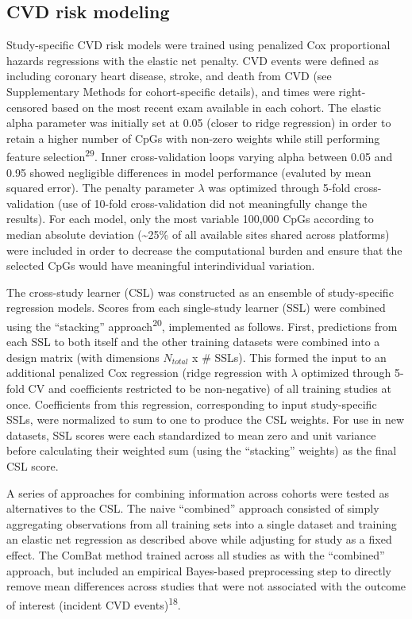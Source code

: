 \documentclass[]{article}
\begin{document}
\hypertarget{cvd-risk-modeling}{%
\subsection{CVD risk modeling}\label{cvd-risk-modeling}}

Study-specific CVD risk models were trained using penalized Cox
proportional hazards regressions with the elastic net penalty. CVD
events were defined as including coronary heart disease, stroke, and
death from CVD (see Supplementary Methods for cohort-specific details),
and times were right-censored based on the most recent exam available in
each cohort. The elastic alpha parameter was initially set at 0.05
(closer to ridge regression) in order to retain a higher number of CpGs
with non-zero weights while still performing feature
selection\textsuperscript{29}. Inner cross-validation loops varying
alpha between 0.05 and 0.95 showed negligible differences in model
performance (evaluted by mean squared error). The penalty parameter
\(\lambda\) was optimized through 5-fold cross-validation (use of
10-fold cross-validation did not meaningfully change the results). For
each model, only the most variable 100,000 CpGs according to median
absolute deviation (\textasciitilde{}25\% of all available sites shared
across platforms) were included in order to decrease the computational
burden and ensure that the selected CpGs would have meaningful
interindividual variation.

The cross-study learner (CSL) was constructed as an ensemble of
study-specific regression models. Scores from each single-study learner
(SSL) were combined using the ``stacking'' approach\textsuperscript{20},
implemented as follows. First, predictions from each SSL to both itself
and the other training datasets were combined into a design matrix (with
dimensions \(N_{total}\) x \# SSLs). This formed the input to an
additional penalized Cox regression (ridge regression with \(\lambda\)
optimized through 5-fold CV and coefficients restricted to be
non-negative) of all training studies at once. Coefficients from this
regression, corresponding to input study-specific SSLs, were normalized
to sum to one to produce the CSL weights. For use in new datasets, SSL
scores were each standardized to mean zero and unit variance before
calculating their weighted sum (using the ``stacking'' weights) as the
final CSL score.

A series of approaches for combining information across cohorts were
tested as alternatives to the CSL. The naive ``combined'' approach
consisted of simply aggregating observations from all training sets into
a single dataset and training an elastic net regression as described
above while adjusting for study as a fixed effect. The ComBat method
trained across all studies as with the ``combined'' approach, but
included an empirical Bayes-based preprocessing step to directly remove
mean differences across studies that were not associated with the
outcome of interest (incident CVD events)\textsuperscript{18}.
\end{document}
